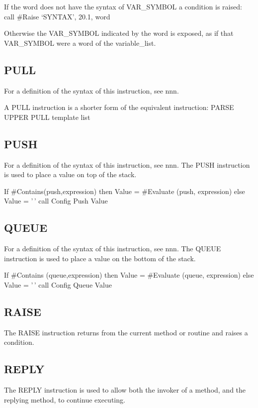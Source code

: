 If the word does not have the syntax of VAR\_SYMBOL a condition is
raised: call \#Raise `SYNTAX', 20.1, word

Otherwise the VAR\_SYMBOL indicated by the word is exposed, as if that
VAR\_SYMBOL were a word of the variable\_list.

\subsection{PULL}\label{pull}

For a definition of the syntax of this instruction, see nnn.

A PULL instruction is a shorter form of the equivalent instruction:
PARSE UPPER PULL template list

\subsection{PUSH}\label{push}

For a definition of the syntax of this instruction, see nnn. The PUSH
instruction is used to place a value on top of the stack.

If \#Contains(push,expression) then Value = \#Evaluate (push,
expression) else Value = '\,' call Config Push Value

\subsection{QUEUE}\label{queue}

For a definition of the syntax of this instruction, see nnn. The QUEUE
instruction is used to place a value on the bottom of the stack.

If \#Contains (queue,expression) then Value = \#Evaluate (queue,
expression) else Value = '\,' call Config Queue Value

\subsection{RAISE}\label{raise}

The RAISE instruction returns from the current method or routine and
raises a condition.

\subsection{REPLY}\label{reply}

The REPLY instruction is used to allow both the invoker of a method, and
the replying method, to continue executing.

